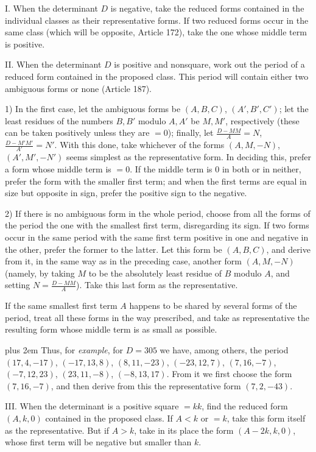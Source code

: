 I. When the determinant $D$ is negative, take the reduced forms contained in the individual classes as their representative forms. If two reduced forms occur in the same class (which will be opposite, Article 172), take the one whose middle term is positive.

II. When the determinant $D$ is positive and nonsquare, work out the period of a reduced form contained in the proposed class. This period will contain either two ambiguous forms or none (Article 187).

1) In the first case, let the ambiguous forms be $(A,B,C)$, $(A',B',C')$; let the least residues of the numbers $B,B'$ modulo $A,A'$ be $M,M'$, respectively (these can be taken positively unless they are $=0$); finally, let $\frac{D-MM}{A}=N$, $\frac{D-M'M'}{A'}=N'$. With this done, take whichever of the forms $(A,M,-N)$, $(A',M',-N')$ seems simplest as the representative form. In deciding this, prefer a form whose middle term is $=0$. If the middle term is $0$ in both or in neither, prefer the form with the smaller first term; and when the first terms are equal in size but opposite in sign, prefer the positive sign to the negative.

2) If there is no ambiguous form in the whole period, choose from all the forms of the period the one with the smallest first term, disregarding its sign. If two forms occur in the same period with the same first term positive in one and negative in the other, prefer the former to the latter. Let this form be $(A,B,C)$, and derive from it, in the same way as in the preceding case, another form $(A,M,-N)$ (namely, by taking $M$ to be the absolutely least residue of $B$ modulo $A$, and setting $N=\frac{D-MM}{A}$). Take this last form as the representative.

If the same smallest first term $A$ happens to be shared by several forms of the period, treat all these forms in the way prescribed, and take as representative the resulting form whose middle term is as small as possible.

{\rightskip=0pt plus 2em Thus, for \textit{example}, for $D=305$ we have, among others, the period $(17,4,-17)$, $(-17,13,8)$, $(8,11,-23)$, $(-23,12,7)$, $(7,16,-7)$, $(-7,12,23)$, $(23,11,-8)$, $(-8,13,17)$. From it we first choose the form $(7,16,-7)$, and then derive from this the representative form $(7,2,-43)$.\par}

III. When the determinant is a positive square $=kk$, find the reduced form $(A,k,0)$ contained in the proposed class. If $A<k$ or $=k$, take this form itself as the representative. But if $A>k$, take in its place the form $(A-2k,k,0)$, whose first term will be negative but smaller than $k$.


